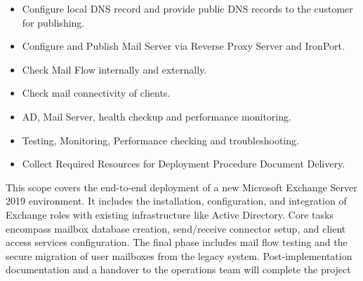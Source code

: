 \begin{itemize}
    \item Configure local DNS record and provide public DNS records to the customer for publishing.
    \item Configure and Publish Mail Server via Reverse Proxy Server and IronPort.
    \item Check Mail Flow internally and externally.
    \item Check mail connectivity of clients.
    \item AD, Mail Server, health checkup and performance monitoring.
    \item Testing, Monitoring, Performance checking and troubleshooting.
    \item Collect Required Resources for Deployment Procedure Document Delivery.
\end{itemize}
This scope covers the end-to-end deployment of a new Microsoft Exchange Server 2019 environment. It includes the installation, configuration, and integration of Exchange roles with existing infrastructure like Active Directory. Core tasks encompass mailbox database creation, send/receive connector setup, and client access services configuration. The final phase includes mail flow testing and the secure migration of user mailboxes from the legacy system. Post-implementation documentation and a handover to the operations team will complete the project
